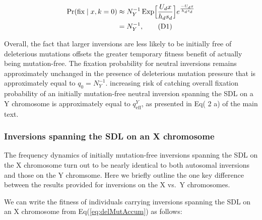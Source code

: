 \documentclass{article}
\newcommand\hl[1]{%
  \bgroup
  \hskip0pt\color{blue!80!black}%
  #1%
  \egroup
}
\newcommand\numberthis{\addtocounter{equation}{1}\tag{\theequation}}
\begin{document}
\begin{align*}\label{eq:NeutralYinvPFix}
		\Pr(\text{fix} \mid x, k = 0) &\approx N^{-1}_Y \, \text{Exp}\Big[ \frac{U_d x}{h_d s_d} \Big] e^{\frac{-U_d x}{h_d s_d}} \\
		 &= N^{-1}_Y , \numberthis
\end{align*}

Overall, the fact that larger inversions are less likely to be initially free of deleterious mutations offsets the greater temporary fitness benefit of actually being mutation-free. The fixation probability for neutral inversions remains approximately unchanged in the presence of deleterious mutation pressure that is approximately equal to $q_0 = N^{-1}_Y$. increasing risk of catching overall fixation probability of an initially mutation-free neutral inversion spanning the SDL on a Y chromosome is approximately equal to $q^Y_{\text{eff}}$, as presented in Eq(\hl{2}a) of the main text.



\subsubsection*{Inversions spanning the SDL on an X chromosome}

The frequency dynamics of initially mutation-free inversions spanning the SDL on the X chromosome turn out to be nearly identical to both autosomal inversions and those on the Y chromsome. Here we briefly outline the one key difference between the results provided for inversions on the X vs.~Y chromosomes. 

We can write the fitness of individuals carrying inversions spanning the SDL on an X chromosome from Eq(\ref{eq:delMutAccum}) as follows:
\end{document}
